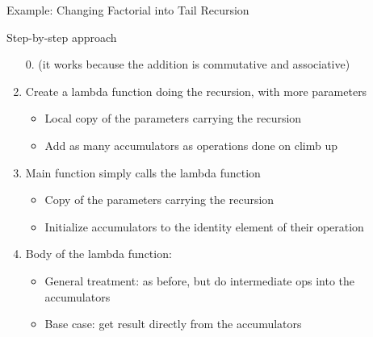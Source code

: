 \begin{frame}{Example: Changing Factorial into Tail Recursion}
  \begin{block}{Step-by-step approach}
    \begin{enumerate}
    \item[0.] (it works because the addition is commutative and associative)
    \item Create a lambda function doing the recursion, with more parameters
      \begin{itemize}
      \item Local copy of the parameters carrying the recursion
      \item Add as many accumulators as operations done on climb up
      \end{itemize}
    \item<2-> Main function simply calls the lambda function
      \begin{itemize}
      \item Copy of the parameters carrying the recursion
      \item Initialize accumulators to the identity element of their operation
      \end{itemize}
    \item<3-> Body of the lambda function:
      \begin{itemize}
      \item General treatment: as before, but do intermediate ops into the accumulators
      \item<4-> Base case: get result directly from the accumulators
      \end{itemize}
    \end{enumerate}
  \end{block}
\end{frame}
